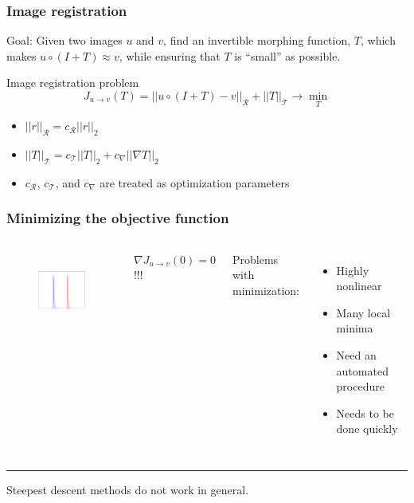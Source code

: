 \documentclass{beamer}
\begin{document}
\begin{frame}
\frametitle{Image registration}
Goal: Given two images $u$ and $v$, find an invertible morphing function, $T$, which makes $u\circ(I+T)\approx v$, while ensuring that $T$ is ``small'' as possible.
\begin{block}{Image registration problem}
\[
J_{u\rightarrow v}(T)=||u\circ(I+T)-v||_\mathcal{R}+||T||_\mathcal{T}\rightarrow\min_T
\]
\end{block}
\begin{itemize}
\item
$||r||_\mathcal{R}=c_\mathcal{R}||r||_2$
\item
$||T||_\mathcal{T}=c_\mathcal{T}||T||_2+c_\nabla||\nabla T||_2$
\item
$c_\mathcal{R}$, $c_\mathcal{T}$, and $c_\nabla$ are treated as optimization parameters
\end{itemize}

\end{frame}

\begin{frame}
\frametitle{Minimizing the objective function}
\begin{columns}[t]
\vspace{-.3in}
\begin{figure}[h]
\includegraphics[height=1in]{eps/reggrad}
\end{figure}
\begin{center}$\nabla J_{u\rightarrow v}(0)=0$!!!\end{center}
Problems with minimization:
\begin{itemize}
\item{Highly nonlinear}
\item{Many local minima}
\item{Need an automated procedure}
\item{Needs to be done quickly}
\end{itemize}
\end{columns}
\vspace{.1in}
\rule{\textwidth}{1pt}
\vspace{.1in}
\begin{center}Steepest descent methods \alert{do not work} in general.\end{center}
\end{frame}
\end{document}
